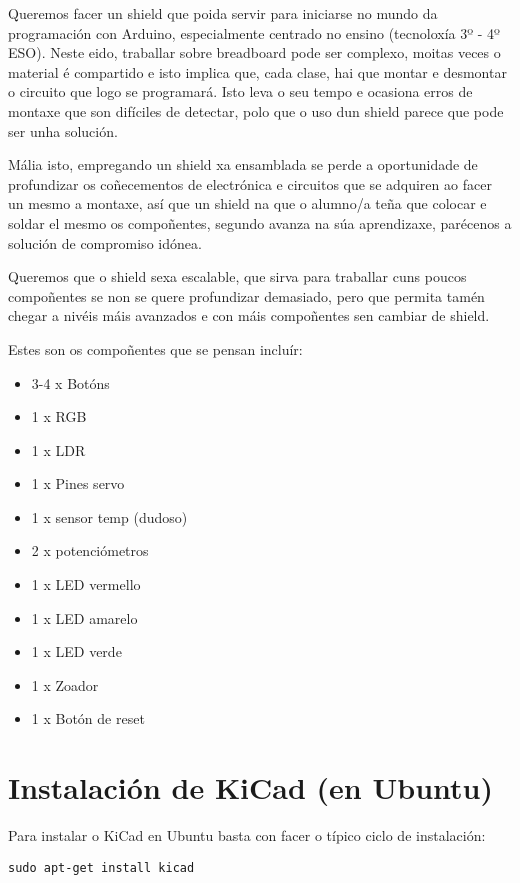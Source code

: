 \documentclass[12pt,galician,]{article}
\providecommand{\tightlist}{%
  \setlength{\itemsep}{0pt}\setlength{\parskip}{0pt}}
\begin{document}
Queremos facer un shield que poida servir para iniciarse no mundo da
programación con Arduino, especialmente centrado no ensino (tecnoloxía
3º - 4º ESO). Neste eido, traballar sobre breadboard pode ser complexo,
moitas veces o material é compartido e isto implica que, cada clase, hai
que montar e desmontar o circuito que logo se programará. Isto leva o
seu tempo e ocasiona erros de montaxe que son difíciles de detectar,
polo que o uso dun shield parece que pode ser unha solución.

Mália isto, empregando un shield xa ensamblada se perde a oportunidade
de profundizar os coñecementos de electrónica e circuitos que se
adquiren ao facer un mesmo a montaxe, así que un shield na que o
alumno/a teña que colocar e soldar el mesmo os compoñentes, segundo
avanza na súa aprendizaxe, parécenos a solución de compromiso idónea.

Queremos que o shield sexa escalable, que sirva para traballar cuns
poucos compoñentes se non se quere profundizar demasiado, pero que
permita tamén chegar a nivéis máis avanzados e con máis compoñentes sen
cambiar de shield.

Estes son os compoñentes que se pensan incluír:

\begin{itemize}
\tightlist
\item
  3-4 x Botóns
\item
  1 x RGB
\item
  1 x LDR
\item
  1 x Pines servo
\item
  1 x sensor temp (dudoso)
\item
  2 x potenciómetros
\item
  1 x LED vermello
\item
  1 x LED amarelo
\item
  1 x LED verde
\item
  1 x Zoador
\item
  1 x Botón de reset
\end{itemize}

\section{Instalación de KiCad (en
Ubuntu)}\label{instalaciuxf3n-de-kicad-en-ubuntu}

Para instalar o KiCad en Ubuntu basta con facer o típico ciclo de
instalación:

\begin{verbatim}
sudo apt-get install kicad
\end{verbatim}
\end{document}
